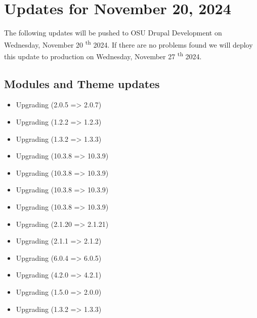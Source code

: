 \section{Updates for November 20, 2024}
The following updates will be pushed to OSU Drupal Development on Wednesday, November 20 \textsuperscript{th} 2024.
If there are no problems found we will deploy this update to production on Wednesday, November 27 \textsuperscript{th} 2024.
\subsection{Modules and Theme updates}
\begin{itemize}
    \item Upgrading  (2.0.5 => 2.0.7)
    \item Upgrading  (1.2.2 => 1.2.3)
    \item Upgrading  (1.3.2 => 1.3.3)
    \item Upgrading  (10.3.8 => 10.3.9)
    \item Upgrading  (10.3.8 => 10.3.9)
    \item Upgrading  (10.3.8 => 10.3.9)
    \item Upgrading  (10.3.8 => 10.3.9)
    \item Upgrading  (2.1.20 => 2.1.21)
    \item Upgrading  (2.1.1 => 2.1.2)
    \item Upgrading  (6.0.4 => 6.0.5)
    \item Upgrading  (4.2.0 => 4.2.1)
    \item Upgrading  (1.5.0 => 2.0.0)
    \item Upgrading  (1.3.2 => 1.3.3)
\end{itemize}
